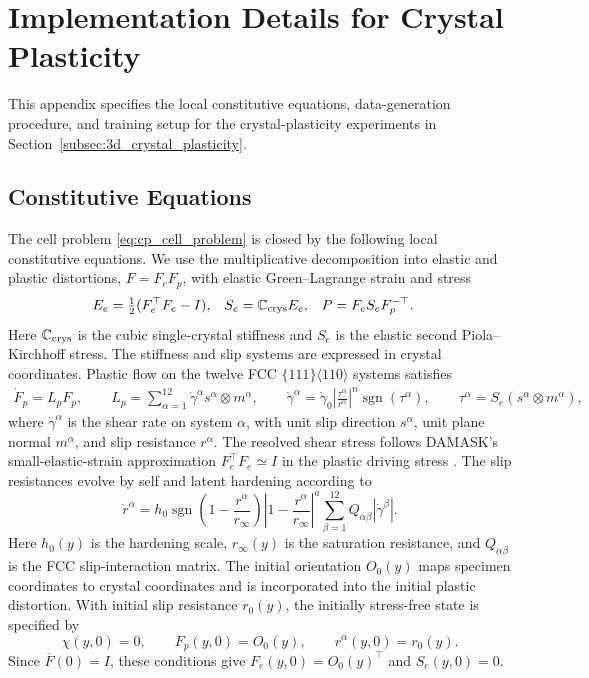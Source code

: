 \section{Implementation Details for Crystal Plasticity}\label{app:cp3d_details}

{This appendix specifies the local constitutive equations, data-generation procedure, and training setup for the crystal-plasticity experiments in Section~\ref{subsec:3d_crystal_plasticity}.}

{\color{blue}
\subsection{Constitutive Equations}\label{app:cp3d_constitutive}
The cell problem \cref{eq:cp_cell_problem} is closed by the following local constitutive equations. We use the multiplicative decomposition into elastic and plastic distortions, $F=F_eF_p$, with elastic Green--Lagrange strain and stress
\begin{align*}
    E_e&=\tfrac12(F_e^{\top}F_e-I),
    &S_e&=\mathbb{C}_{\rm crys}E_e,
    &P&=F_eS_eF_p^{-\top}.
\end{align*}
Here $\mathbb{C}_{\rm crys}$ is the cubic single-crystal stiffness and $S_e$ is the elastic second Piola--Kirchhoff stress. The stiffness and slip systems are expressed in crystal coordinates. Plastic flow on the twelve FCC $\{111\}\langle110\rangle$ systems satisfies
\begin{align*}
    \dot F_p=L_pF_p,\qquad L_p=\sum_{\alpha=1}^{12}\dot\gamma^\alpha s^\alpha\otimes m^\alpha,\qquad \dot\gamma^\alpha=\dot\gamma_0\left|\frac{\tau^\alpha}{r^\alpha}\right|^n\operatorname{sgn}(\tau^\alpha),\qquad \tau^\alpha=S_e(s^\alpha\otimes m^\alpha),
\end{align*}
where $\dot\gamma^\alpha$ is the shear rate on system $\alpha$, with unit slip direction $s^\alpha$, unit plane normal $m^\alpha$, and slip resistance $r^\alpha$. The resolved shear stress follows DAMASK's small-elastic-strain approximation $F_e^{\top}F_e\simeq I$ in the plastic driving stress \cite[Appendix C]{roters2019damask}. The slip resistances evolve by self and latent hardening according to
\begin{equation*}
    \dot r^\alpha=h_0\operatorname{sgn}\!\left(1-\frac{r^\alpha}{r_\infty}\right)\left|1-\frac{r^\alpha}{r_\infty}\right|^a\sum_{\beta=1}^{12}Q_{\alpha\beta}|\dot\gamma^\beta|.
\end{equation*}
Here $h_0(y)$ is the hardening scale, $r_\infty(y)$ is the saturation resistance, and $Q_{\alpha\beta}$ is the FCC slip-interaction matrix. The initial orientation $O_0(y)$ maps specimen coordinates to crystal coordinates and is incorporated into the initial plastic distortion. With initial slip resistance $r_0(y)$, the initially stress-free state is specified by
\begin{equation*}
    \chi(y,0)=0,\qquad F_p(y,0)=O_0(y),\qquad r^\alpha(y,0)=r_0(y).
\end{equation*}
Since $\overline F(0)=I$, these conditions give $F_e(y,0)=O_0(y)^{\top}$ and $S_e(y,0)=0$.

}

